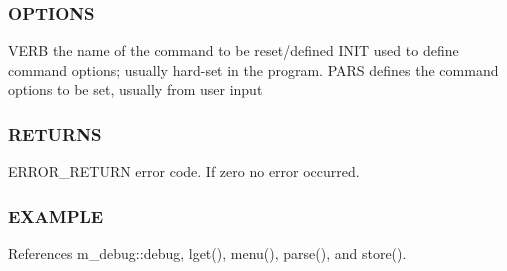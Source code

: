 \subsubsection*{O\+P\+T\+I\+O\+NS}

V\+E\+RB the name of the command to be reset/defined I\+N\+IT used to define command options; usually hard-\/set in the program. P\+A\+RS defines the command options to be set, usually from user input

\subsubsection*{R\+E\+T\+U\+R\+NS}

E\+R\+R\+O\+R\+\_\+\+R\+E\+T\+U\+RN error code. If zero no error occurred.

\subsubsection*{E\+X\+A\+M\+P\+LE}

References m\+\_\+debug\+::debug, lget(), menu(), parse(), and store().


